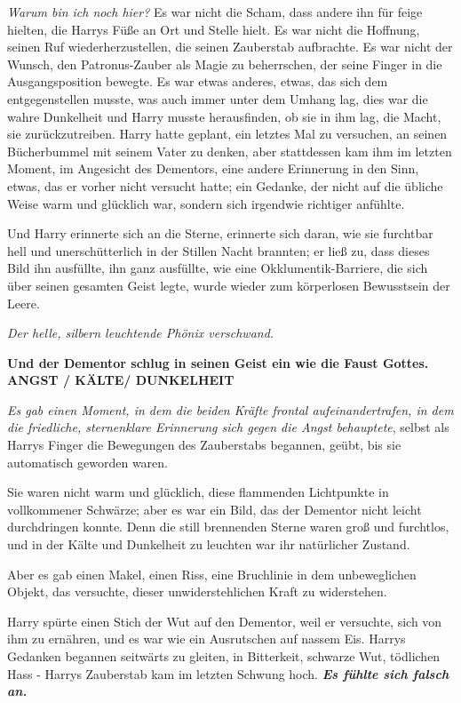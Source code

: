 \emph{Warum bin ich noch hier?} Es war nicht die Scham, dass andere ihn für
feige hielten, die Harrys Füße an Ort und Stelle hielt. Es war nicht die
Hoffnung, seinen Ruf wiederherzustellen, die seinen Zauberstab aufbrachte. Es
war nicht der Wunsch, den Patronus-Zauber als Magie zu beherrschen, der seine
Finger in die Ausgangsposition bewegte. Es war etwas anderes, etwas, das sich
dem entgegenstellen musste, was auch immer unter dem Umhang lag, dies war die
wahre Dunkelheit und Harry musste herausfinden, ob sie in ihm lag, die Macht,
sie zurückzutreiben. Harry hatte geplant, ein letztes Mal zu versuchen, an
seinen Bücherbummel mit seinem Vater zu denken, aber stattdessen kam ihm im
letzten Moment, im Angesicht des Dementors, eine andere Erinnerung in den Sinn,
etwas, das er vorher nicht versucht hatte; ein Gedanke, der nicht auf die
übliche Weise warm und glücklich war, sondern sich irgendwie richtiger anfühlte.

Und Harry erinnerte sich an die Sterne, erinnerte sich daran, wie sie furchtbar
hell und unerschütterlich in der Stillen Nacht brannten; er ließ zu, dass dieses
Bild ihn ausfüllte, ihn ganz ausfüllte, wie eine Okklumentik-Barriere, die sich
über seinen gesamten Geist legte, wurde wieder zum körperlosen Bewusstsein der
Leere.

\emph{Der helle, silbern leuchtende Phönix verschwand.}

\textbf{Und der Dementor schlug in seinen Geist ein wie die Faust Gottes.}
\textbf{ANGST / KÄLTE/ DUNKELHEIT}

\emph{Es gab einen Moment, in dem die beiden Kräfte frontal aufeinandertrafen,
in dem die friedliche, sternenklare Erinnerung sich gegen die Angst behauptete},
selbst als Harrys Finger die Bewegungen des Zauberstabs begannen, geübt, bis sie
automatisch geworden waren.

Sie waren nicht warm und glücklich, diese flammenden Lichtpunkte in vollkommener
Schwärze; aber es war ein Bild, das der Dementor nicht leicht durchdringen
konnte. Denn die still brennenden Sterne waren groß und furchtlos, und in der
Kälte und Dunkelheit zu leuchten war ihr natürlicher Zustand.

Aber es gab einen Makel, einen Riss, eine Bruchlinie in dem unbeweglichen
Objekt, das versuchte, dieser unwiderstehlichen Kraft zu widerstehen.

Harry spürte einen Stich der Wut auf den Dementor, weil er versuchte, sich von
ihm zu ernähren, und es war wie ein Ausrutschen auf nassem Eis. Harrys Gedanken
begannen seitwärts zu gleiten, in Bitterkeit, schwarze Wut, tödlichen Hass -
Harrys Zauberstab kam im letzten Schwung hoch. \textbf{\emph{ Es fühlte sich
falsch an.}}

